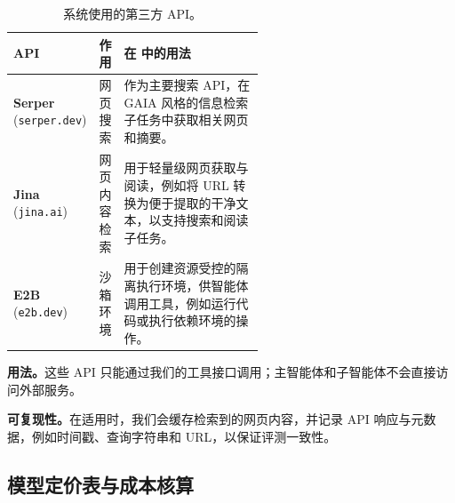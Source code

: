 \begin{table}[h]
\centering
\small
\begin{threeparttable}
\caption{系统使用的第三方 API。}
\label{tab:third_party_apis}
\begin{tabular}{l l p{0.56\linewidth}}
\toprule
\textbf{API} & \textbf{作用} & \textbf{在 \our{} 中的用法} \\
\midrule
\textbf{Serper} (\texttt{serper.dev}) & 网页搜索 & 作为主要搜索 API，在 GAIA 风格的信息检索子任务中获取相关网页和摘要。 \\
\textbf{Jina} (\texttt{jina.ai}) & 网页内容检索 & 用于轻量级网页获取与阅读，例如将 URL 转换为便于提取的干净文本，以支持搜索和阅读子任务。 \\
\textbf{E2B} (\texttt{e2b.dev}) & 沙箱环境 & 用于创建资源受控的隔离执行环境，供智能体调用工具，例如运行代码或执行依赖环境的操作。 \\
\bottomrule
\end{tabular}
\begin{tablenotes}[flushleft]\footnotesize
\item \textbf{用法。}这些 API 只能通过我们的工具接口调用；主智能体和子智能体不会直接访问外部服务。
\item \textbf{可复现性。}在适用时，我们会缓存检索到的网页内容，并记录 API 响应与元数据，例如时间戳、查询字符串和 URL，以保证评测一致性。
\end{tablenotes}
\end{threeparttable}
\end{table}



\subsection{模型定价表与成本核算}
\label{app:E2}



